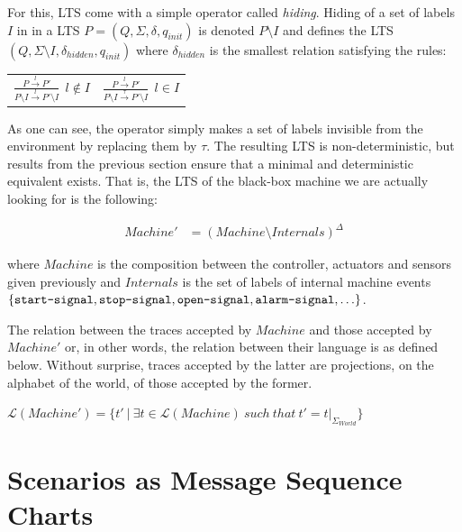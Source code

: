 For this, LTS come with a simple operator called \emph{hiding}. Hiding of a set of labels $I$ in in a LTS $P = (Q,\Sigma,\delta,q_{init})$ is denoted $P \setminus I$ and defines the LTS $(Q,\Sigma \setminus I,\delta_{hidden},q_{init})$ where $\delta_{hidden}$ is the smallest relation satisfying the rules:

\begin{center}
\begin{tabular}{cc}
$\frac{\displaystyle P \stackrel{l}{\longrightarrow} P'}{\displaystyle P \setminus I \stackrel{l}{\longrightarrow} P' \setminus I}~~l \notin I$ & 
$\frac{\displaystyle P \stackrel{l}{\longrightarrow} P'}{\displaystyle P \setminus I \stackrel{\tau}{\longrightarrow} P' \setminus I}~~l \in I$ \\
\end{tabular}
\end{center}

As one can see, the operator simply makes a set of labels invisible from the environment by replacing them by $\tau$. The resulting LTS is non-deterministic, but results from the previous section ensure that a minimal and deterministic equivalent exists. That is, the LTS of the black-box machine we are actually looking for is the following:

\vspace{-0.8cm}
\begin{align*}
Machine' &= (Machine \setminus Internals)^\Delta
\end{align*}
\vspace{-0.8cm}

\noindent where $Machine$ is the composition between the controller, actuators and sensors given previously and $Internals$ is the set of labels of internal machine events $\{\texttt{start-signal}, \texttt{stop-signal}, \texttt{open-signal}, \texttt{alarm-signal}, \ldots\}$. 

The relation between the traces accepted by $Machine$ and those accepted by $Machine'$ or, in other words, the relation between their language is as defined below. Without surprise, traces accepted by the latter are projections, on the alphabet of the world, of those accepted by the former.

\begin{center}
$\mathcal{L}(Machine') = \{ t'~|~\exists t \in \mathcal{L}(Machine)~such~that~t' = t|_{\Sigma_{World}}\}$
\end{center}

\section{Scenarios as Message Sequence Charts}

